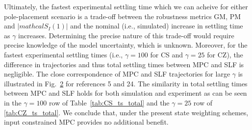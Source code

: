\documentclass[twocolumn,twoside]{IEEEtran}
\begin{document}
\begin{figure*}[h!]
  \begin{subfigure}{1\columnwidth}
    
    \caption{
    }
  \label{fig:min_gam_traj}
\end{subfigure}
\hfill
\begin{subfigure}{1\columnwidth}
  
  \caption{
  }
  \label{fig:rob_gam_traj}
\end{subfigure}
\caption{Stage output (top row) and control increment (bottom row) experimental trajectories for references 5 and 24 (circled in Fig.~\ref{fig:steps}). (a) Trajectories for the smallest tested values of $\gamma$. (b) Trajectories for the values of $\gamma$ resulting in the fastest total experimental settling time. As indicated in \eqref{eqn:duHinf}, $(\Delta u_{X})_{\textrm{max}} = 0.1980$.}
\end{figure*}

Ultimately, the fastest experimental settling time which we can acheive for either pole-placement scenario is a trade-off between the robustness metrics  GM, PM and $|mathcal{S}_I(1)|$ and the nominal (i.e., simulated) increase in settling time as $\gamma$ increases. Determining the precise nature of this trade-off would require precise knowledge of the model uncertainty, which is unknown. Moreover, for the fastest experimental settling times (i.e., ${\gamma=100}$ for CS and ${\gamma=25}$ for CZ), the difference in trajectories and thus total settling times between MPC and SLF is negligible. The close correspondence of MPC and SLF trajectories for large $\gamma$ is illustrated in Fig.~\ref{fig:rob_gam_traj} for references 5 and 24. The similarity in total settling times between MPC and SLF holds for both simulation and experiment as can be seen in the ${\gamma=100}$ row of Table~\ref{tab:CS_ts_total} and the ${\gamma=25}$ row of \ref{tab:CZ_ts_total}. We conclude that, under the present state weighting schemes, input constrained MPC provides no additional benefit.
\end{document}
